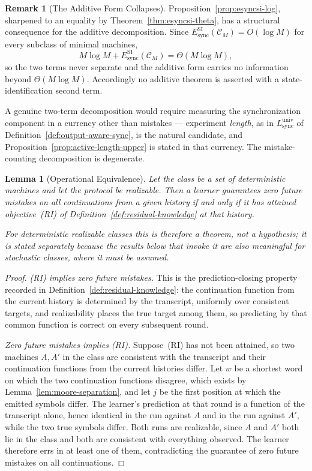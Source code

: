 \documentclass[12pt]{article}
\newtheorem{lemma}[theorem]{Lemma}
\theoremstyle{definition}
\newtheorem{remark}[theorem]{Remark}
\newcommand{\Lsyncu}{L_{\mathrm{sync}}^{\mathrm{univ}}}
\newcommand{\EsyncSI}{E_{\mathrm{sync}}^{\mathrm{SI}}}
\begin{document}
\begin{remark}[The Additive Form Collapses]
\label{rem:additive-collapses}
Proposition~\ref{prop:esyncsi-log}, sharpened to an equality by
Theorem~\ref{thm:esyncsi-theta}, has a structural consequence for the
additive decomposition.  Since $\EsyncSI(\mathcal C_M)=O(\log M)$ for every
subclass of minimal machines,
\[
M\log M+\EsyncSI(\mathcal C_M)=\Theta(M\log M),
\]
so the two terms never separate and the additive form carries no information
beyond $\Theta(M\log M)$.  Accordingly no additive theorem is asserted with a
state-identification second term.

A genuine two-term decomposition would require measuring the synchronization
component in a currency other than mistakes --- experiment \emph{length}, as in
$\Lsyncu$ of Definition~\ref{def:output-aware-sync}, is the natural candidate,
and Proposition~\ref{prop:active-length-upper} is stated in that currency.  The
mistake-counting decomposition is degenerate.
\end{remark}

\begin{lemma}[Operational Equivalence]
\label{lem:operational-equivalence}
Let the class be a set of deterministic machines and let the protocol be
realizable.  Then a learner guarantees zero future mistakes on all
continuations from a given history if and only if it has attained
objective~(RI) of Definition~\ref{def:residual-knowledge} at that history.

For deterministic realizable classes this is therefore a theorem, not a
hypothesis; it is stated separately because the results below that invoke it
are also meaningful for stochastic classes, where it must be assumed.
\end{lemma}

\begin{proof}
\emph{(RI) implies zero future mistakes.}  This is the prediction-closing
property recorded in Definition~\ref{def:residual-knowledge}: the continuation
function from the current history is determined by the transcript, uniformly
over consistent targets, and realizability places the true target among them,
so predicting by that common function is correct on every subsequent round.

\emph{Zero future mistakes implies (RI).}  Suppose~(RI) has not been attained,
so two machines $A,A'$ in the class are consistent with the transcript and
their continuation functions from the current histories differ.  Let $w$ be a
shortest word on which the two continuation functions disagree, which exists by
Lemma~\ref{lem:moore-separation}, and let $j$ be the first position at which
the emitted symbols differ.  The learner's prediction at that round is a
function of the transcript alone, hence identical in the run against $A$ and in
the run against $A'$, while the two true symbols differ.  Both runs are
realizable, since $A$ and $A'$ both lie in the class and both are consistent
with everything observed.  The learner therefore errs in at least one of them,
contradicting the guarantee of zero future mistakes on all continuations.
\end{proof}
\end{document}
